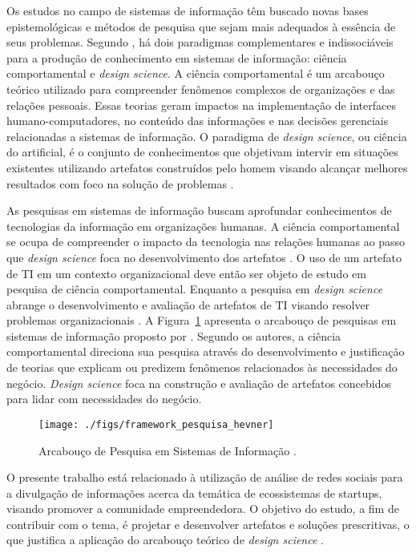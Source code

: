 Os estudos no campo de sistemas de informação têm buscado novas bases epistemológicas e métodos de pesquisa que sejam mais adequados à essência de seus problemas. Segundo , há dois paradigmas complementares e indissociáveis para a produção de conhecimento em sistemas de informação: ciência comportamental e \textit{design science}. A ciência comportamental é um arcabouço teórico utilizado para compreender fenômenos complexos de organizações e das relações pessoais. Essas teorias geram impactos na implementação de interfaces humano-computadores, no conteúdo das informações e nas decisões gerenciais relacionadas a sistemas de informação. O paradigma de \textit{design science}, ou ciência do artificial, é o conjunto de conhecimentos que objetivam intervir em situações existentes utilizando artefatos construídos pelo homem visando alcançar melhores resultados com foco na solução de problemas \cite{simon:1996}.

As pesquisas em sistemas de informação buscam aprofundar conhecimentos de tecnologias da informação em organizações humanas. A ciência comportamental se ocupa de compreender o impacto da tecnologia nas relações humanas ao passo que \textit{design science} foca no desenvolvimento dos artefatos \cite{lee-et-al:2014}. O uso de um artefato de TI em um contexto organizacional deve então ser objeto de estudo em pesquisa de ciência comportamental. Enquanto a pesquisa em \textit{design science} abrange o desenvolvimento e avaliação de artefatos de TI visando resolver problemas organizacionais \cite{hevner-et-al-2004}. A Figura~\ref{arcabouco-pesquisaSI} apresenta o arcabouço de pesquisas em sistemas de informação proposto por . Segundo os autores, a ciência comportamental direciona sua pesquisa através do desenvolvimento e justificação de teorias que explicam ou predizem fenômenos relacionados às necessidades do negócio. \textit{Design science} foca na construção e avaliação de artefatos concebidos para lidar com necessidades do negócio.

\begin{figure}
	\centering
	\texttt{[image: ./figs/framework\_pesquisa\_hevner]}
	\caption{Arcabouço de Pesquisa em Sistemas de Informação \cite{hevner-et-al-2004}.}
	\label{arcabouco-pesquisaSI}
\end{figure}

O presente trabalho está relacionado à utilização de análise de redes sociais para a divulgação de informações acerca da temática de ecossistemas de startups, visando promover a comunidade empreendedora. O objetivo do estudo, a fim de contribuir com o tema, é projetar e desenvolver artefatos e soluções prescritivas, o que  justifica a aplicação do arcabouço teórico de \textit{design science} \cite{dresch:2015}.

